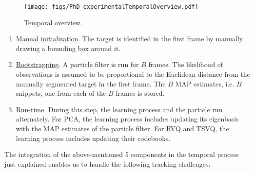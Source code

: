 								\begin{figure}[t]
								\centering
								\texttt{[image: figs/PhD\_experimentalTemporalOverview.pdf]}
								\caption{Temporal overview.}
								\label{fig:temporal_overview}
								\end{figure}


\begin{enumerate}
\item \underline{Manual initialization}.  The target is identified in the first frame by manually drawing a bounding box around it.


\item \underline{Bootstrapping}.  A particle filter is run for $B$ frames.  The likelihood of observations is assumed to be proportional to the Euclidean distance from the manually segmented target in the first frame.  The $B$ MAP estimates, i.e. $B$ snippets, one from each of the $B$ frames is stored.

  \item \underline{Run-time}.  During this step, the learning process and the particle run alternately.  For PCA, the learning process includes updating its eigenbasis with the MAP estimates of the particle filter.  For RVQ and TSVQ, the learning process includes updating their codebooks. 
\end{enumerate}



The integration of the above-mentioned 5 components in the temporal process just explained enables us to handle the following tracking challenges:

